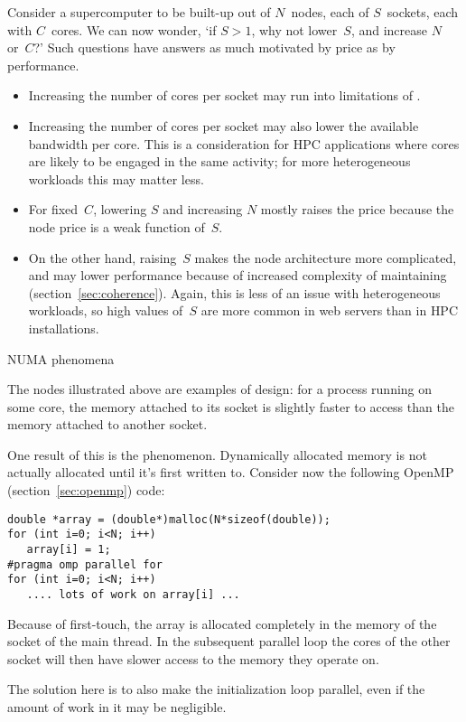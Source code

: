 Consider a supercomputer 
to be built-up out of $N$~nodes, each of $S$~sockets,
each with $C$~cores. 
We can now wonder, `if $S>1$, why not lower~$S$,
and increase $N$ or~$C$?'
Such questions have answers as much motivated by price as by performance.
\begin{itemize}
\item Increasing the number of cores per socket may run into
  limitations of .
\item Increasing the number of cores per socket may also
  lower the available bandwidth per core.
  This is a consideration for \ac{HPC} applications where
  cores are likely to be engaged in the same activity;
  for more heterogeneous workloads this may matter less.
\item For fixed~$C$, lowering $S$ and increasing $N$ mostly raises
  the price because the node price is a weak function of~$S$.
\item On the other hand, raising~$S$ makes the node architecture
  more complicated, and may lower performance because of
  increased complexity of maintaining 
  (section~\ref{sec:coherence}).
  Again, this is less of an issue with heterogeneous workloads,
  so high values of~$S$ are more common in web servers than
  in \ac{HPC} installations.
\end{itemize}

 {NUMA phenomena}

The nodes illustrated above are examples of  design:
for a process running on some core,
the memory attached to its socket is slightly faster to
access than the memory attached to another socket.

One result of this is the  phenomenon.
Dynamically allocated memory is not actually allocated until it's
first written to. Consider now the following OpenMP
(section~\ref{sec:openmp}) code:
\begin{verbatim}
double *array = (double*)malloc(N*sizeof(double));
for (int i=0; i<N; i++)
   array[i] = 1;
#pragma omp parallel for
for (int i=0; i<N; i++)
   .... lots of work on array[i] ...
\end{verbatim}
Because of first-touch, the array is allocated completely in the
memory of the socket of the main thread.
In the subsequent parallel
loop the cores of the other socket will then have slower access to the
memory they operate on.

The solution here is to also make the initialization loop parallel,
even if the amount of work in it may be negligible.

